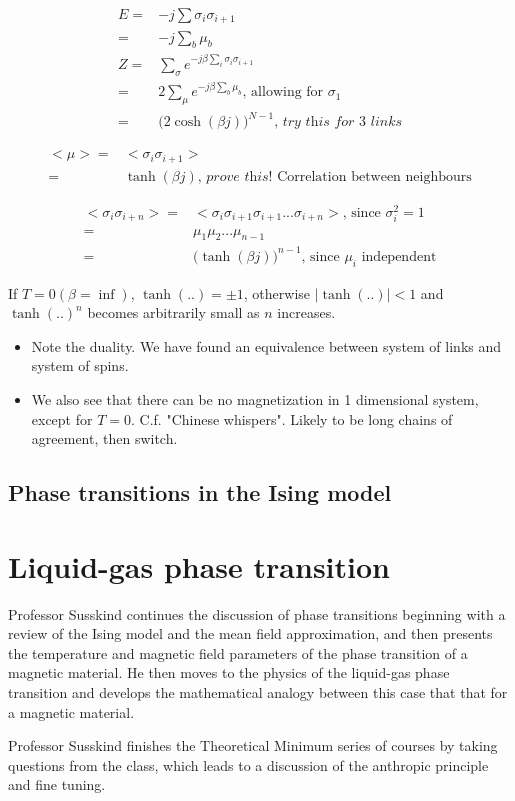 \documentclass[]{article}
\begin{document}
\begin{align*}
E =& -j \sum \sigma_i \sigma_{i+1}\\
=& -j \sum_{b} \mu_b\\
Z =& \sum_{\sigma} e^{- j \beta\sum_i  \sigma_i \sigma_{i+1}}\\
=& 2 \sum_{\mu} e^{- j \beta  \sum_b \mu_b} \text{, allowing for $\sigma_1$}\\
=& \big(2 \cosh(\beta j)\big)^{N-1}\textit{, try this for 3 links}
\end{align*}

\begin{align*}
\big< \mu \big> =& \big< \sigma_i \sigma_{i+1} \big>\\
=& \tanh(\beta j) \textit{, prove this!}\text{ Correlation between neighbours}
\end{align*}

\begin{align*}
\big < \sigma_i \sigma_{i+n} \big> =&  \big < \sigma_i \sigma_{i+1} \sigma_{i+1}... \sigma_{i+n} \big>\text{, since $\sigma_i^2 = 1$}\\
=& \mu_1 \mu_2 ... \mu_{n-1}\\
=& \big( \tanh(\beta j)\big)^{n-1}\text{, since $\mu_i$ independent}
\end{align*}

If $T=0(\beta=\inf)$, $\tanh(..)=\pm1$, otherwise $\lvert \tanh(..) \rvert<1$ and $\tanh(..)^n$ becomes arbitrarily small as $n$ increases.

\begin{itemize}
	\item Note the duality. We have found an equivalence between system of links and system of spins. 
	\item We also see that there can be no magnetization in 1 dimensional system, except for $T=0$. C.f. "Chinese whispers". Likely to be long chains of agreement, then switch.
\end{itemize}
 
\subsection{Phase transitions in the Ising model}


\section{Liquid-gas phase transition}



Professor Susskind continues the discussion of phase transitions beginning with a review of the Ising model and the mean field approximation, and then presents the temperature and magnetic field parameters of the phase transition of a magnetic material. He then moves to the physics of the liquid-gas phase transition and develops the mathematical analogy between this case that that for a magnetic material.

Professor Susskind finishes the Theoretical Minimum series of courses by taking questions from the class, which leads to a discussion of the anthropic principle and fine tuning.
\end{document}
